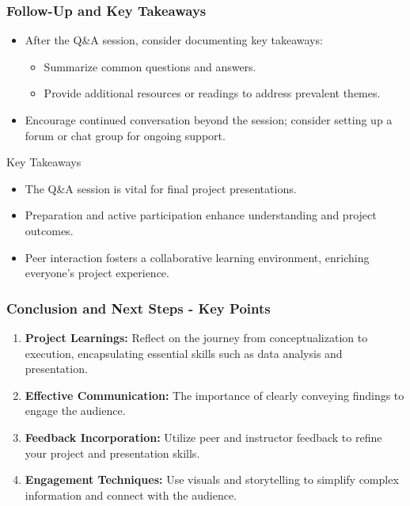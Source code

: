 \documentclass[aspectratio=169]{beamer}
\begin{document}
\begin{frame}[fragile]
    \frametitle{Follow-Up and Key Takeaways}
    \begin{itemize}
        \item After the Q\&A session, consider documenting key takeaways:
        \begin{itemize}
            \item Summarize common questions and answers.
            \item Provide additional resources or readings to address prevalent themes.
        \end{itemize}
        \item Encourage continued conversation beyond the session; consider setting up a forum or chat group for ongoing support.
    \end{itemize}
    
    \begin{block}{Key Takeaways}
        \begin{itemize}
            \item The Q\&A session is vital for final project presentations.
            \item Preparation and active participation enhance understanding and project outcomes.
            \item Peer interaction fosters a collaborative learning environment, enriching everyone's project experience.
        \end{itemize}
    \end{block}
\end{frame}

\begin{frame}[fragile]
    \frametitle{Conclusion and Next Steps - Key Points}
    \begin{enumerate}
        \item \textbf{Project Learnings:} Reflect on the journey from conceptualization to execution, encapsulating essential skills such as data analysis and presentation.
        \item \textbf{Effective Communication:} The importance of clearly conveying findings to engage the audience.
        \item \textbf{Feedback Incorporation:} Utilize peer and instructor feedback to refine your project and presentation skills.
        \item \textbf{Engagement Techniques:} Use visuals and storytelling to simplify complex information and connect with the audience.
    \end{enumerate}
\end{frame}
\end{document}
